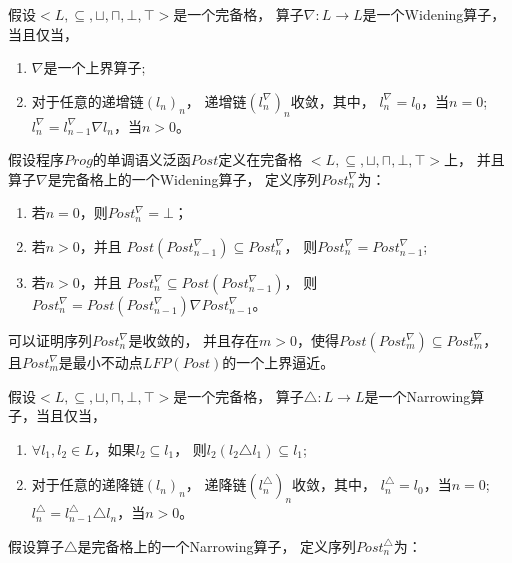 \begin{definition}[Widening算子]
假设$<L,\subseteq, \sqcup, \sqcap, \bot,\top>$是一个完备格，
算子$\nabla: L \rightarrow L$是一个Widening算子，当且仅当，
\begin{enumerate}
\item $\nabla$是一个上界算子;
\item 对于任意的递增链$(l_n)_n$，
递增链$(l_{n}^{\nabla})_n$收敛，其中，
$l_{n}^{\nabla} = l_0$，当$n=0$;
 $l_{n}^{\nabla} = l_{n-1}^{\nabla} \nabla l_n$，当$n>0$。
\end{enumerate}
\end{definition}

假设程序$Prog$的单调语义泛函$Post$定义在完备格
$<L,\subseteq, \sqcup, \sqcap, \bot,\top>$上，
并且算子$\nabla$是完备格上的一个Widening算子，
定义序列$Post_{n}^{\nabla}$为：

\begin{enumerate}
\item 若$n=0$，则$Post_{n}^{\nabla} = \bot$；
\item 若$n > 0$，并且
$Post(Post_{n-1}^{\nabla}) \subseteq Post_{n}^{\nabla}$，
则$Post_{n}^{\nabla} = Post_{n-1}^{\nabla}$;
\item 若$n > 0$，并且
$Post_{n}^{\nabla} \subseteq Post(Post_{n-1}^{\nabla})$，
则$Post_{n}^{\nabla} = Post(Post_{n-1}^{\nabla}) \nabla  Post_{n-1}^{\nabla}$。
\end{enumerate}

可以证明序列$Post_{n}^{\nabla}$是收敛的，
并且存在$m > 0$，使得$Post(Post_{m}^{\nabla}) \subseteq Post_{m}^{\nabla}$，
且$Post_{m}^{\nabla}$是最小不动点$LFP(Post)$的一个上界逼近。

\begin{definition}[Narrowing算子]
假设$<L,\subseteq, \sqcup, \sqcap, \bot,\top>$是一个完备格，
算子$\triangle: L \rightarrow L$是一个Narrowing算子，当且仅当，
\begin{enumerate}
\item $\forall l_1,l_2 \in L$，如果$l_2 \subseteq l_1$，
	则$l_2 (l_2\triangle l_1) \subseteq l_1$;
\item 对于任意的递降链$(l_n)_n$，
	递降链$(l_{n}^{\triangle})_n$收敛，其中，
	$l_{n}^{\triangle} = l_0$，当$n=0$;
	$l_{n}^{\triangle} = l_{n-1}^{\triangle} \triangle l_n$，当$n>0$。
\end{enumerate}
\end{definition}

假设算子$\triangle$是完备格上的一个Narrowing算子，
定义序列$Post_{n}^{\triangle}$为：

